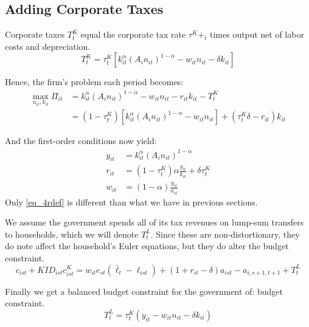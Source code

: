 \documentclass[letterpaper,12pt]{article}
\theoremstyle{definition}
\numberwithin{equation}{section}
\begin{document}
\begin{spacing}{1.5}
\section{Adding Corporate Taxes}
	Corporate taxes $T^K_t$ equal the corporate tax rate $\tau^K+_t$ times output net of labor costs and depreciation.
	\begin{equation}
		T^K_t = \tau^K_t \left[ k_{it}^\alpha \left( A_{i} n_{it} \right)^{1-\alpha} - w_{it}n_{it} - \delta k_{it} \right]
	\end{equation}

	Hence, the firm's problem each period becomes:
	\begin{align}
		\max_{n_{it},k_{it}} \Pi_{it} & = k_{it}^\alpha \left( A_{i} n_{it} \right)^{1-\alpha} - w_{it}n_{it} - r_{it}k_{it} - T^K_t \nonumber \\
		& = (1-\tau^K_t)\left[k_{it}^\alpha \left( A_{i} n_{it} \right)^{1-\alpha} - w_{it}n_{it}\right] + (\tau^K_t \delta - r_{it})k_{it} \nonumber
	\end{align}	

	And the first-order conditions now yield:
	\begin{align}
		y_{it} & = k_{it}^\alpha \left( A_{i} n_{it} \right)^{1-\alpha} \nonumber \\
		r_{it} & = (1-\tau^K_t)\alpha \frac{y_{it}}{k_{it}} + \delta \tau^K_t \label{eq_4rdef} \\
		w_{it} & = (1-\alpha) \frac{y_{it}}{n_{it}} \nonumber
	\end{align}
	Only \eqref{eq_4rdef} is different than what we have in previous sections.

	We assume the government spends all of its tax revenues on lump-sum transfers to households, which we will denote $T^L_t$.  Since these are non-distortionary, they do note affect the household's Euler equations, but they do alter the budget constraint.
	\begin{equation} \nonumber
		c_{ist} + KID_{ist}c^K_{ist} = w_{it} e_{st} (\bar \ell_t -\ell_{ist}) + (1+r_{it}-\delta)a_{ist} - a_{i,s+1,t+1} + T^L_t
	\end{equation}

	Finally we get a balanced budget constraint for the government of:
	budget constraint.
	\begin{equation} \nonumber
		T^L_t = \tau^K_t (y_{it} - w_{it}n_{it} - \delta k_{it})
	\end{equation}


\end{spacing}
\end{document}
